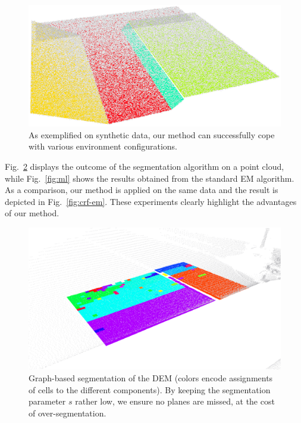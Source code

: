 \begin{figure}[t]
\centering
\includegraphics[width=\columnwidth]{fig/sampled.eps}
\caption{As exemplified on synthetic data, our method can successfully cope with
various environment configurations.}
\label{fig:complex}
\end{figure}

Fig.~\ref{fig:segment} displays the outcome of the segmentation algorithm on a
point cloud, while Fig.~\ref{fig:ml} shows the results obtained from the
standard EM algorithm. As a comparison, our method is applied on the same data
and the result is depicted in Fig.~\ref{fig:crf-em}. These experiments clearly
highlight the advantages of our method.

\begin{figure}[t]
\centering
\includegraphics[width=\columnwidth]{fig/segment.eps}
\caption{Graph-based segmentation of the DEM (colors encode assignments of
cells to the different components). By keeping the segmentation parameter $s$
rather low, we ensure no planes are missed, at the cost of over-segmentation.}
\label{fig:segment}
\end{figure}

